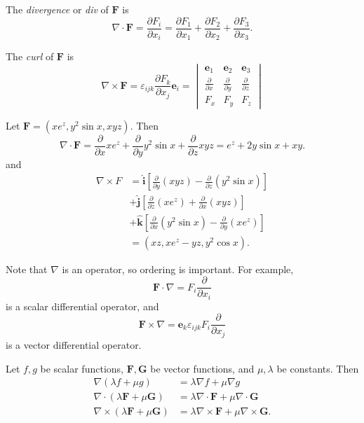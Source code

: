 \documentclass[a4paper]{article}
\begin{document}
\begin{defi}[Divergence]
  The \emph{divergence} or \emph{div} of $\mathbf{F}$ is
  \[
    \nabla\cdot \mathbf{F} = \frac{\partial F_i}{\partial x_i} = \frac{\partial F_1}{\partial x_1} + \frac{\partial F_2}{\partial x_2} + \frac{\partial F_3}{\partial x_3}.
  \]
\end{defi}

\begin{defi}[Curl]
  The \emph{curl} of $\mathbf{F}$ is
  \[
    \nabla\times \mathbf{F} = \varepsilon_{ijk}\frac{\partial F_k}{\partial x_j}\mathbf{e}_i = \begin{vmatrix}
      \mathbf{e}_1 & \mathbf{e}_2 & \mathbf{e}_3\\
      \frac{\partial}{\partial x} & \frac{\partial}{\partial y} & \frac{\partial}{\partial z}\\
      F_x & F_y & F_z
    \end{vmatrix}
  \]
\end{defi}

\begin{eg}
  Let $\mathbf{F} = (xe^z, y^2\sin x, xyz)$. Then
  \[
    \nabla \cdot \mathbf{F} = \frac{\partial }{\partial x}xe^z + \frac{\partial}{\partial y}y^2 \sin x + \frac{\partial}{\partial z}xyz = e^z + 2y\sin x + xy.
  \]
  and
  \begin{align*}
    \nabla \times F &= \hat{\mathbf{i}} \left[\frac{\partial}{\partial y}(xyz) - \frac{\partial}{\partial z}(y^2\sin x)\right]\\
    &+ \hat{\mathbf{j}} \left[\frac{\partial}{\partial z}(xe^z) + \frac{\partial}{\partial x}(xyz)\right]\\
    &+ \hat{\mathbf{k}}\left[\frac{\partial}{\partial x}(y^2\sin x) - \frac{\partial}{\partial y} (xe^z)\right]\\
    &= (xz, xe^z - yz, y^2\cos x).
  \end{align*}
\end{eg}
Note that $\nabla$ is an operator, so ordering is important. For example,
\[
  \mathbf{F}\cdot \nabla = F_i\frac{\partial }{\partial x_i}
\]
is a scalar differential operator, and
\[
  \mathbf{F}\times \nabla = \mathbf{e}_k\varepsilon_{ijk}F_i\frac{\partial}{\partial x_j}
\]
is a vector differential operator.

\begin{prop}
  Let $f, g$ be scalar functions, $\mathbf{F}, \mathbf{G}$ be vector functions, and $\mu, \lambda$ be constants. Then
  \begin{align*}
    \nabla(\lambda f + \mu g) &= \lambda\nabla f + \mu\nabla g\\
    \nabla\cdot (\lambda \mathbf{F} + \mu \mathbf{G}) &= \lambda\nabla \cdot \mathbf{F} + \mu\nabla\cdot \mathbf{G}\\
    \nabla\times (\lambda \mathbf{F} + \mu \mathbf{G}) &= \lambda\nabla\times \mathbf{F} + \mu\nabla\times \mathbf{G}.
  \end{align*}
\end{prop}
\end{document}
